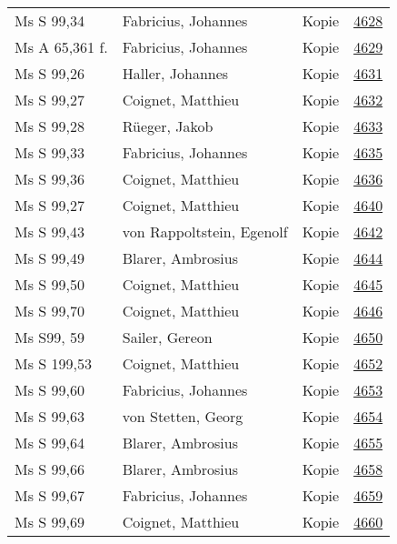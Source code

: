 \documentclass[10pt,a4paper,landscape]{report}
\begin{document}
\begin{longtable}{p{16cm}p{4cm}lr}
Ms S 99,34	&	Fabricius, Johannes	&	Kopie	&	\href{http://130.60.24.72/assignment/4628}{4628}\\
Ms A 65,361 f.	&	Fabricius, Johannes	&	Kopie	&	\href{http://130.60.24.72/assignment/4629}{4629}\\
Ms S 99,26	&	Haller, Johannes	&	Kopie	&	\href{http://130.60.24.72/assignment/4631}{4631}\\
Ms S 99,27	&	Coignet, Matthieu	&	Kopie	&	\href{http://130.60.24.72/assignment/4632}{4632}\\
Ms S 99,28	&	Rüeger, Jakob	&	Kopie	&	\href{http://130.60.24.72/assignment/4633}{4633}\\
Ms S 99,33	&	Fabricius, Johannes	&	Kopie	&	\href{http://130.60.24.72/assignment/4635}{4635}\\
Ms S 99,36	&	Coignet, Matthieu	&	Kopie	&	\href{http://130.60.24.72/assignment/4636}{4636}\\
Ms S 99,27	&	Coignet, Matthieu	&	Kopie	&	\href{http://130.60.24.72/assignment/4640}{4640}\\
Ms S 99,43	&	von Rappoltstein, Egenolf	&	Kopie	&	\href{http://130.60.24.72/assignment/4642}{4642}\\
Ms S 99,49	&	Blarer, Ambrosius	&	Kopie	&	\href{http://130.60.24.72/assignment/4644}{4644}\\
Ms S 99,50	&	Coignet, Matthieu	&	Kopie	&	\href{http://130.60.24.72/assignment/4645}{4645}\\
Ms S 99,70	&	Coignet, Matthieu	&	Kopie	&	\href{http://130.60.24.72/assignment/4646}{4646}\\
Ms S99, 59	&	Sailer, Gereon	&	Kopie	&	\href{http://130.60.24.72/assignment/4650}{4650}\\
Ms S 199,53	&	Coignet, Matthieu	&	Kopie	&	\href{http://130.60.24.72/assignment/4652}{4652}\\
Ms S 99,60	&	Fabricius, Johannes	&	Kopie	&	\href{http://130.60.24.72/assignment/4653}{4653}\\
Ms S 99,63	&	von Stetten, Georg	&	Kopie	&	\href{http://130.60.24.72/assignment/4654}{4654}\\
Ms S 99,64	&	Blarer, Ambrosius	&	Kopie	&	\href{http://130.60.24.72/assignment/4655}{4655}\\
Ms S 99,66	&	Blarer, Ambrosius	&	Kopie	&	\href{http://130.60.24.72/assignment/4658}{4658}\\
Ms S 99,67	&	Fabricius, Johannes	&	Kopie	&	\href{http://130.60.24.72/assignment/4659}{4659}\\
Ms S 99,69	&	Coignet, Matthieu	&	Kopie	&	\href{http://130.60.24.72/assignment/4660}{4660}\\

\end{longtable}
\end{document}
